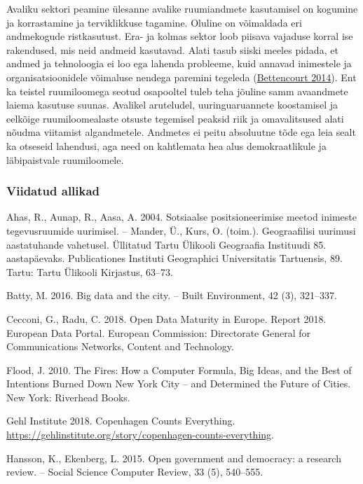 \documentclass[estonian,]{article}
\begin{document}
Avaliku sektori peamine ülesanne avalike ruumiandmete kasutamisel on kogumine ja korrastamine ja terviklikkuse tagamine. Oluline on võimaldada eri andmekogude ristkasutust. Era- ja kolmas sektor loob piisava vajaduse korral ise rakendused, mis neid andmeid kasutavad. Alati tasub siiski meeles pidada, et andmed ja tehnoloogia ei loo ega lahenda probleeme, kuid annavad inimestele ja organisatsioonidele võimaluse nendega paremini tegeleda (\protect\hyperlink{Bettencourt2014}{Bettencourt 2014}). Ent ka teistel ruumiloomega seotud osapooltel tuleb teha jõuline samm avaandmete laiema kasutuse suunas. Avalikel aruteludel, uuringuaruannete koostamisel ja eelkõige ruumiloomealaste otsuste tegemisel peaksid riik ja omavalitsused alati nõudma viitamist algandmetele. Andmetes ei peitu absoluutne tõde ega leia sealt ka otseseid lahendusi, aga need on kahtlemata hea alus demokraatlikule ja läbipaistvale ruumiloomele.

\hypertarget{viidatud-allikad-10}{%
\subsubsection*{Viidatud allikad}\label{viidatud-allikad-10}}

Ahas, R., Aunap, R., Aasa, A. 2004. Sotsiaalse positsioneerimise meetod inimeste tegevusruumide uurimisel. -- Mander, Ü., Kurs, O. (toim.). Geograafilisi uurimusi aastatuhande vahetusel. Üllitatud Tartu Ülikooli Geograafia Instituudi 85. aastapäevaks. Publicationes Instituti Geographici Universitatis Tartuensis, 89. Tartu: Tartu Ülikooli Kirjastus, 63--73.

Batty, M. 2016. Big data and the city. -- Built Environment, 42 (3), 321--337.

Cecconi, G., Radu, C. 2018. Open Data Maturity in Europe. Report 2018. European Data Portal. European Commission: Directorate General for Communications Networks, Content and Technology.

Flood, J. 2010. The Fires: How a Computer Formula, Big Ideas, and the Best of Intentions Burned Down New York City -- and Determined the Future of Cities. New York: Riverhead Books.

Gehl Institute 2018. Copenhagen Counts Everything. \url{https://gehlinstitute.org/story/copenhagen-counts-everything}.

Hansson, K., Ekenberg, L. 2015. Open government and democracy: a research review. -- Social Science Computer Review, 33 (5), 540--555.
\end{document}
